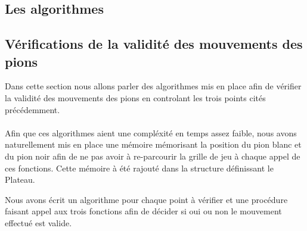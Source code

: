 \documentclass[a4paper, draft]{article}
\begin{document}
\subsection{Les algorithmes}



\subsection{Vérifications de la validité des mouvements des pions}

Dans cette section nous allons parler des algorithmes mis en place afin de vérifier la validité des mouvements des pions en controlant les trois points cités précédemment.\\
\vspace{0.25cm}\\
Afin que ces algorithmes aient une compléxité en temps assez faible, nous avons naturellement mis en place une mémoire mémorisant la position du pion blanc et du pion noir
afin de ne pas avoir à re-parcourir la grille de jeu à chaque appel de ces fonctions. Cette mémoire à été rajouté dans la structure définissant le Plateau.\\
\vspace{0.15cm}


Nous avons écrit un algorithme pour chaque point à vérifier et une procédure faisant appel aux trois fonctions afin de décider si oui ou non le mouvement effectué est valide.
\end{document}
